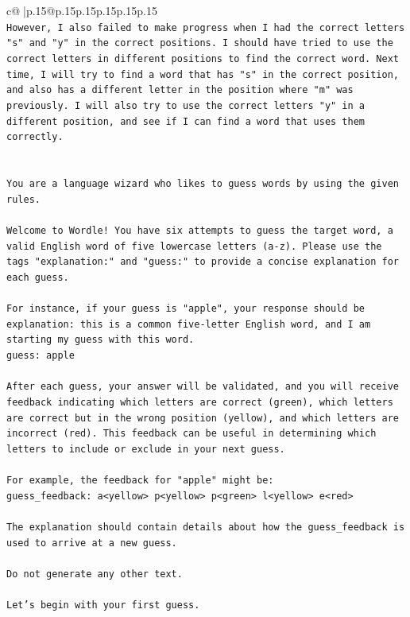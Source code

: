 \documentclass{article}
\begin{document}
{\begin{supertabular}{c@{$\;$}|p{.15\linewidth}@{}p{.15\linewidth}p{.15\linewidth}p{.15\linewidth}p{.15\linewidth}p{.15\linewidth}}
{{{\\ 
\texttt{However, I also failed to make progress when I had the correct letters "s" and "y" in the correct positions. I should have tried to use the correct letters in different positions to find the correct word. Next time, I will try to find a word that has "s" in the correct position, and also has a different letter in the position where "m" was previously. I will also try to use the correct letters "y" in a different position, and see if I can find a word that uses them correctly.} \\
\\ 
\\ 
\texttt{You are a language wizard who likes to guess words by using the given rules.} \\
\\ 
\texttt{Welcome to Wordle! You have six attempts to guess the target word, a valid English word of five lowercase letters (a{-}z). Please use the tags "explanation:" and "guess:" to provide a concise explanation for each guess.} \\
\\ 
\texttt{For instance, if your guess is "apple", your response should be} \\
\texttt{explanation: this is a common five{-}letter English word, and I am starting my guess with this word.} \\
\texttt{guess: apple} \\
\\ 
\texttt{After each guess, your answer will be validated, and you will receive feedback indicating which letters are correct (green), which letters are correct but in the wrong position (yellow), and which letters are incorrect (red). This feedback can be useful in determining which letters to include or exclude in your next guess.} \\
\\ 
\texttt{For example, the feedback for "apple" might be:} \\
\texttt{guess\_feedback: a<yellow> p<yellow> p<green> l<yellow> e<red>} \\
\\ 
\texttt{The explanation should contain details about how the guess\_feedback is used to arrive at a new guess.} \\
\\ 
\texttt{Do not generate any other text.} \\
\\ 
\texttt{Let's begin with your first guess.} \\
            }
        }
    }
     \\ \\


\end{supertabular}}
\end{document}

